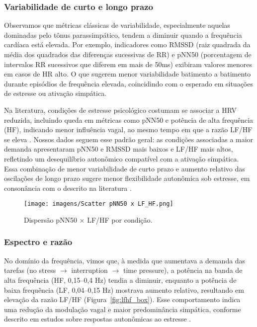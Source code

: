 \documentclass[conference]{IEEEtran}
\begin{document}
\subsubsection{Variabilidade de curto e longo prazo}

Observamos que métricas clássicas de variabilidade, especialmente aquelas dominadas pelo tônus parassimpático, tendem a diminuir quando a frequência cardíaca está elevada. Por exemplo, indicadores como RMSSD (raiz quadrada da média dos quadrados das diferenças sucessivas de RR) e pNN50 (porcentagem de intervalos RR sucessivos que diferem em mais de 50ms) exibiram valores menores em casos de HR alto. O que sugerem menor variabilidade batimento a batimento durante episódios de frequência elevada, coincidindo com o esperado em situações de estresse ou ativação simpática.

Na literatura, condições de estresse psicológico costumam se associar a HRV reduzida, incluindo queda em métricas como pNN50 e potência de alta frequência (HF), indicando menor influência vagal, ao mesmo tempo em que a razão LF/HF se eleva \cite{R1}. Nossos dados seguem esse padrão geral: as condições associadas a maior demanda apresentaram pNN50 e RMSSD mais baixos e LF/HF mais altos, refletindo um desequilíbrio autonômico compatível com a ativação simpática. Essa combinação de menor variabilidade de curto prazo e aumento relativo das oscilações de longo prazo sugere menor flexibilidade autonômica sob estresse, em consonância com o descrito na literatura \cite{R1}.

\begin{figure}[H]
    \centering
    \texttt{[image: imagens/Scatter pNN50 x LF\_HF.png]}
    \caption{Dispersão pNN50 × LF/HF por condição.}
    \label{fig:pnn50_X_LFHF}
\end{figure}

\subsubsection{Espectro e razão}

No domínio da frequência, vimos que, à medida que aumentava a demanda das tarefas (no stress $\rightarrow$ interruption $\rightarrow$ time pressure), a potência na banda de alta frequência (HF, 0,15–0,4 Hz) tendia a diminuir, enquanto a potência de baixa frequência (LF, 0,04–0,15 Hz) mostrava aumento relativo, resultando em elevação da razão LF/HF (Figura~\ref{fig:lfhf_box}). Esse comportamento indica uma redução da modulação vagal e maior predominância simpática, conforme descrito em estudos sobre respostas autonômicas ao estresse \cite{R1}.
\end{document}

